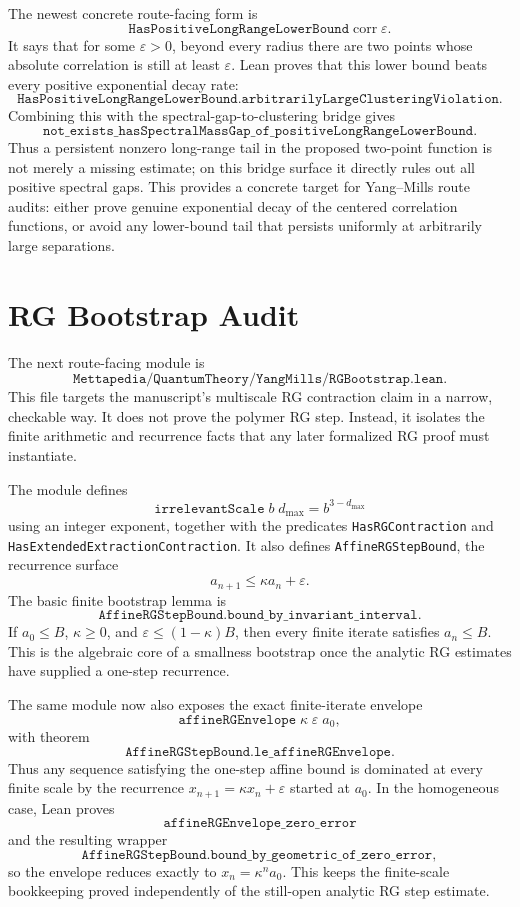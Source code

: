 \documentclass[11pt]{article}
\newcommand{\lean}[1]{\texttt{#1}}
\begin{document}
The newest concrete route-facing form is
\[
  \lean{HasPositiveLongRangeLowerBound}\;\mathrm{corr}\;\varepsilon.
\]
It says that for some \(\varepsilon>0\), beyond every radius there are two
points whose absolute correlation is still at least \(\varepsilon\).  Lean
proves that this lower bound beats every positive exponential decay rate:
\[
  \lean{HasPositiveLongRangeLowerBound.arbitrarilyLargeClusteringViolation}.
\]
Combining this with the spectral-gap-to-clustering bridge gives
\[
  \lean{not\_exists\_hasSpectralMassGap\_of\_positiveLongRangeLowerBound}.
\]
Thus a persistent nonzero long-range tail in the proposed two-point function is
not merely a missing estimate; on this bridge surface it directly rules out
all positive spectral gaps.  This provides a concrete target for Yang--Mills
route audits: either prove genuine exponential decay of the centered
correlation functions, or avoid any lower-bound tail that persists uniformly at
arbitrarily large separations.

\section{RG Bootstrap Audit}

The next route-facing module is
\[
  \lean{Mettapedia/QuantumTheory/YangMills/RGBootstrap.lean}.
\]
This file targets the manuscript's multiscale RG contraction claim in a narrow,
checkable way.  It does not prove the polymer RG step.  Instead, it isolates the
finite arithmetic and recurrence facts that any later formalized RG proof must
instantiate.

The module defines
\[
  \lean{irrelevantScale}\;b\;d_{\max}=b^{3-d_{\max}}
\]
using an integer exponent, together with the predicates
\lean{HasRGContraction} and \lean{HasExtendedExtractionContraction}.  It also
defines \lean{AffineRGStepBound}, the recurrence surface
\[
  a_{n+1}\le \kappa a_n+\varepsilon.
\]
The basic finite bootstrap lemma is
\[
  \lean{AffineRGStepBound.bound\_by\_invariant\_interval}.
\]
If \(a_0\le B\), \(\kappa\ge 0\), and
\(\varepsilon\le(1-\kappa)B\), then every finite iterate satisfies
\(a_n\le B\).  This is the algebraic core of a smallness bootstrap once the
analytic RG estimates have supplied a one-step recurrence.

The same module now also exposes the exact finite-iterate envelope
\[
  \lean{affineRGEnvelope}\;\kappa\;\varepsilon\;a_0,
\]
with theorem
\[
  \lean{AffineRGStepBound.le\_affineRGEnvelope}.
\]
Thus any sequence satisfying the one-step affine bound is dominated at every
finite scale by the recurrence \(x_{n+1}=\kappa x_n+\varepsilon\) started at
\(a_0\).  In the homogeneous case, Lean proves
\[
  \lean{affineRGEnvelope\_zero\_error}
\]
and the resulting wrapper
\[
  \lean{AffineRGStepBound.bound\_by\_geometric\_of\_zero\_error},
\]
so the envelope reduces exactly to \(x_n=\kappa^n a_0\).  This keeps the
finite-scale bookkeeping proved independently of the still-open analytic RG
step estimate.
\end{document}
